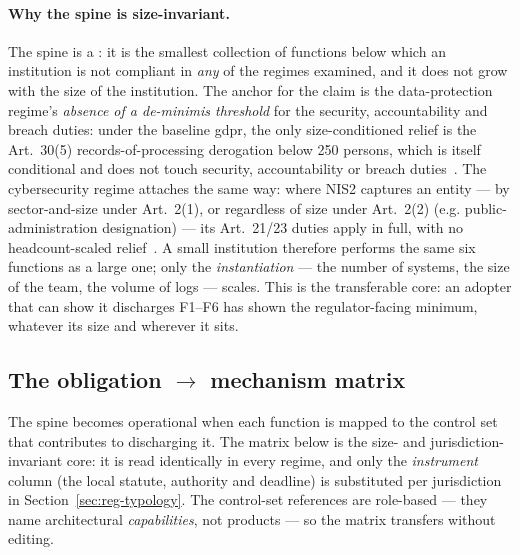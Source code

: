 \paragraph{Why the spine is size-invariant.} The spine is a
: it is the smallest collection of
functions below which an institution is not compliant in \emph{any} of
the regimes examined, and it does not grow with the size of the
institution. The anchor for the claim is the data-protection regime's
\emph{absence of a de-minimis threshold} for the security,
accountability and breach duties: under the baseline \gls{gdpr}, the
only size-conditioned relief is the Art.~30(5) records-of-processing
derogation below 250 persons, which is itself conditional and does not
touch security, accountability or breach duties~\cite{gdpr}. The
cybersecurity regime attaches the same way: where NIS2 captures an
entity --- by sector-and-size under Art.~2(1), or regardless of size
under Art.~2(2) (e.g. public-administration designation) --- its
Art.~21/23 duties apply in full, with no headcount-scaled
relief~\cite{nis2}. A small
institution therefore performs the same six functions as a large one;
only the \emph{instantiation} --- the number of systems, the size of
the team, the volume of logs --- scales. This is the transferable
core: an adopter that can show it discharges F1--F6 has shown the
regulator-facing minimum, whatever its size and wherever it sits.

\subsection{The obligation \texorpdfstring{$\rightarrow$}{->}
mechanism matrix}
\label{sec:reg-matrix}

The spine becomes operational when each function is mapped to the
 control set that contributes to discharging it. The
matrix below is the size- and jurisdiction-invariant core: it is read
identically in every regime, and only the \emph{instrument} column (the
local statute, authority and deadline) is substituted per jurisdiction
in Section~\ref{sec:reg-typology}. The control-set references are
role-based --- they name architectural \emph{capabilities}, not
products --- so the matrix transfers without editing.

